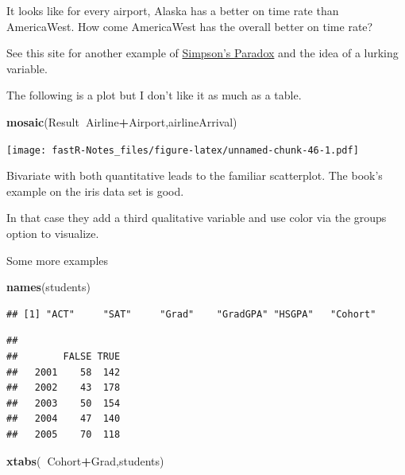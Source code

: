 \documentclass[]{book}
\newenvironment{Shaded}{\begin{snugshade}}{\end{snugshade}}
\newcommand{\KeywordTok}[1]{\textcolor[rgb]{0.13,0.29,0.53}{\textbf{#1}}}
\newcommand{\OperatorTok}[1]{\textcolor[rgb]{0.81,0.36,0.00}{\textbf{#1}}}
\newcommand{\NormalTok}[1]{#1}
\theoremstyle{definition}
\theoremstyle{definition}
\theoremstyle{definition}
\theoremstyle{remark}
\begin{document}
It looks like for every airport, Alaska has a better on time rate than
AmericaWest. How come AmericaWest has the overall better on time rate?

See this site for another example of
\href{http://vudlab.com/simpsons/}{Simpson's Paradox} and the idea of a
lurking variable.

The following is a plot but I don't like it as much as a table.

\begin{Shaded}
\begin{Highlighting}[]
\KeywordTok{mosaic}\NormalTok{(Result}\OperatorTok{~}\NormalTok{Airline}\OperatorTok{+}\NormalTok{Airport,airlineArrival)}
\end{Highlighting}
\end{Shaded}

\texttt{[image: fastR-Notes\_files/figure-latex/unnamed-chunk-46-1.pdf]}

Bivariate with both quantitative leads to the familiar scatterplot. The
book's example on the iris data set is good.

In that case they add a third qualitative variable and use color via the
groups option to visualize.

Some more examples

\begin{Shaded}
\begin{Highlighting}[]
\KeywordTok{names}\NormalTok{(students)}
\end{Highlighting}
\end{Shaded}

\begin{verbatim}
## [1] "ACT"     "SAT"     "Grad"    "GradGPA" "HSGPA"   "Cohort"
\end{verbatim}

\begin{Shaded}
\end{Shaded}

\begin{verbatim}
##       
##        FALSE TRUE
##   2001    58  142
##   2002    43  178
##   2003    50  154
##   2004    47  140
##   2005    70  118
\end{verbatim}

\begin{Shaded}
\begin{Highlighting}[]
\KeywordTok{xtabs}\NormalTok{(}\OperatorTok{~}\NormalTok{Cohort}\OperatorTok{+}\NormalTok{Grad,students)}
\end{Highlighting}
\end{Shaded}
\end{document}
